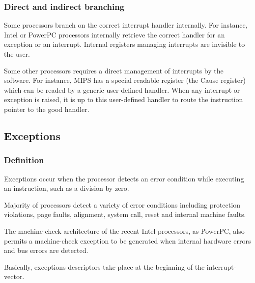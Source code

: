 
\begin{frame}
  \frametitle{Direct and indirect branching}

Some processors branch on the correct interrupt handler internally. For instance, Intel or PowerPC processors internally retrieve the correct handler for an exception or an interrupt. Internal registers managing interrupts are invisible to the user.

\-

Some other processors requires a direct management of interrupts by the software. For instance, MIPS has a special readable register (the Cause register) which can be readed by a generic user-defined handler. When any interrupt or exception is raised, it is up to this user-defined handler to route the instruction pointer to the good handler.

\end{frame}


\subsection{Exceptions}


\begin{frame}
  \frametitle{Definition}

Exceptions occur when the processor detects an error condition while executing an instruction, such as a division by zero.

\-

Majority of processors detect a variety of error conditions including protection violations, page faults, alignment, system call, reset and internal machine faults.

\-

The machine-check architecture of the recent Intel processors, as PowerPC, also permits a machine-check exception to be generated when internal hardware errors and bus errors are detected.

\-

Basically, exceptions descriptors take place at the beginning of the interrupt-vector. 

\end{frame}


